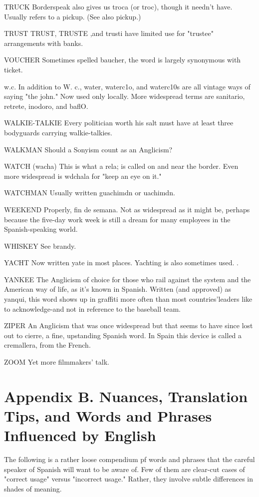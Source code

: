 TRUCK Borderspeak also gives us troca (or troc), though it
needn't have. Usually refers to a pickup. (See also pickup.)

TRUST TRUST, TRUSTE ,and trusti have limited use for
"trustee" arrangements with banks.

VOUCHER Sometimes spelled baucher, the word is largely
synonymous with ticket.

w.c. In addition to W. c., water, waterc1o, and waterc10s are
all vintage ways of saying "the john." Now used only locally. More
widespread terms are sanitario, retrete, inodoro, and baflO.

WALKIE-TALKIE Every politician worth his salt must have at
least three bodyguards carrying walkie-talkies.

WALKMAN Should a Sonyism count as an Anglicism?

WATCH (wacha) This is what a rela; is called on and near the
border. Even more widespread is wdchala for "keep an eye on it."

WATCHMAN Usually written guachimdn or uachimdn.

WEEKEND Properly, fin de semana. Not as widespread as it
might be, perhaps because the five-day work week is still a dream for
many employees in the Spanish-speaking world.

WHISKEY See brandy.

YACHT Now written yate in most places. Yachting is also
sometimes used. .

YANKEE The Anglicism of choice for those who rail against
the system and the American way of life, as it's known in Spanish.
Written (and approved) as yanqui, this word shows up in graffiti more
often than most countries'leaders like to acknowledge-and not in
reference to the baseball team.

ZIPER An Anglicism that was once widespread but that
seems to have since lost out to cierre, a fine, upstanding Spanish
word. In Spain this device is called a cremallera, from the French.

ZOOM Yet more filmmakers' talk.

\chapter{Appendix B. Nuances, Translation Tips, and Words and Phrases Influenced by English}

The following is a rather loose compendium pf words and
phrases that the careful speaker of Spanish will want to be aware of.
Few of them are clear-cut cases of "correct usage" versus "incorrect usage." Rather, they involve subtle differences in shades of meaning.


